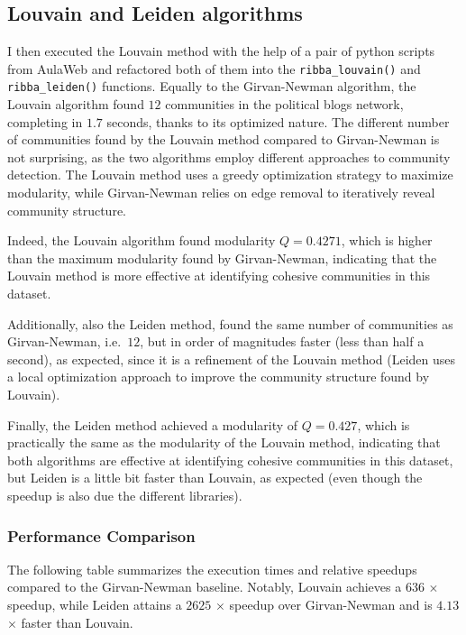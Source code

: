 \documentclass{article}
\begin{document}
\subsection{Louvain and Leiden algorithms}
I then executed the Louvain method with the help of a pair of python scripts from AulaWeb and refactored both  of them into the \texttt{ribba\_louvain()} and \texttt{ribba\_leiden()} functions.
Equally to the Girvan-Newman algorithm, the Louvain algorithm found $12$ communities in the political blogs network, completing in $1.7$ seconds, thanks to its optimized nature.
The different number of communities found by the Louvain method compared to Girvan-Newman is not surprising, as the two algorithms employ different approaches to community detection.
The Louvain method uses a greedy optimization strategy to maximize modularity, while Girvan-Newman relies on edge removal to iteratively reveal community structure.

Indeed, the Louvain algorithm found modularity $Q = 0.4271$, which is higher than the maximum modularity found by Girvan-Newman, indicating that the Louvain method is more effective at identifying cohesive communities in this dataset.

Additionally, also the Leiden method, found the same number of communities as Girvan-Newman, i.e.\ $12$, but in order of magnitudes faster (less than half a second), as expected, since it is a refinement of the Louvain method (Leiden uses a local optimization approach to improve the community structure found by Louvain).

Finally, the Leiden method achieved a modularity of $Q = 0.427$, which is practically the same as the modularity of the Louvain method, indicating that both algorithms are effective at identifying cohesive communities in this dataset, but Leiden is a little bit faster than Louvain, as expected (even though the speedup is also due the different libraries).



\subsubsection{Performance Comparison}
The following table summarizes the execution times and relative speedups compared to the Girvan-Newman baseline. Notably, Louvain achieves a $636$ $\times$ speedup, while Leiden attains a $2625$ $\times$ speedup over Girvan-Newman and is $4.13$ $\times$ faster than Louvain.
\end{document}
